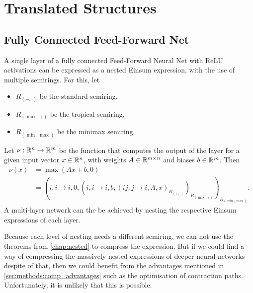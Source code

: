 \section{Translated Structures}
\subsection{Fully Connected Feed-Forward Net}
A single layer of a fully connected Feed-Forward Neural Net with ReLU activations can be expressed as a nested Einsum expression, with the use of multiple semirings.
For this, let
\begin{itemize}
    \item $R_{(+, \cdot)}$ be the standard semiring,
    \item $R_{(\max, +)}$ be the tropical semiring,
    \item $R_{(\min, \max)}$ be the minimax semiring.
\end{itemize}
Let $\nu: \mathbb{R}^n \rightarrow \mathbb{R}^m$ be the function that computes the output of the layer for a given input vector $x \in \mathbb{R}^n$, with weights $A \in \mathbb{R}^{m \times n}$ and biases $b \in \mathbb{R}^m$.
Then
\begin{align*}
    \nu(x) & = \max(Ax + b, 0)                                                                                                                   \\
           & = (i,i\rightarrow i, 0, (i,i \rightarrow i, b, (ij, j \rightarrow i, A, x)_{R_{(+, \cdot)}} )_{R_{(\max, +)}} )_{R_{(\min, \max)}}.
\end{align*}
A multi-layer network can the be achieved by nesting the respective Einsum expressions of each layer.

Because each level of nesting needs a different semiring, we can not use the theorems from \autoref{chap:nested} to compress the expression.
But if we could find a way of compressing the massively nested expressions of deeper neural networks despite of that, then we could benefit from the advantages mentioned in \autoref{sec:methods:comp_advantages} such as the optimisation of contraction paths.
Unfortunately, it is unlikely that this is possible.



